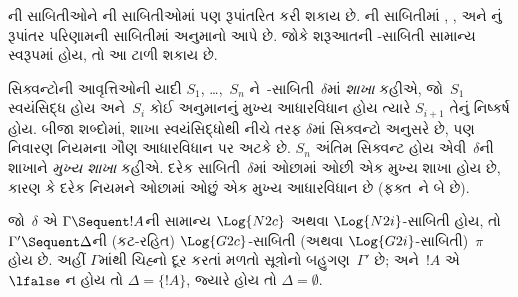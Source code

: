 ની
સાબિતીઓને
ની
સાબિતીઓમાં
પણ રૂપાંતરિત
કરી શકાય છે.
ની
સાબિતીમાં
\Elim{\land},
\Elim{\lif},
\Elim{\lnot} અને
\Elim{\lforall}નું
રૂપાંતર પરિણામની
સાબિતીમાં
\Cut{} અનુમાનો
આપે છે.
જોકે શરૂઆતની
-સાબિતી
સામાન્ય સ્વરૂપમાં
હોય, તો આ
ટાળી શકાય છે.

સિક્વન્ટોની
આવૃત્તિઓની
યાદી
$S_1$, \dots,~$S_n$
ને~-સાબિતી~$\delta$માં
\emph{શાખા} કહીએ,
જો~$S_1$
સ્વયંસિદ્ધ હોય
અને~$S_i$
કોઈ અનુમાનનું
મુખ્ય આધારવિધાન
હોય ત્યારે
$S_{i+1}$
તેનું નિષ્કર્ષ
હોય. બીજા
શબ્દોમાં, શાખા
સ્વયંસિદ્ધોથી
નીચે તરફ
$\delta$માં
સિક્વન્ટો અનુસરે
છે, પણ
નિવારણ
નિયમના ગૌણ
આધારવિધાન પર
અટકે છે.
$S_n$ અંતિમ
સિક્વન્ટ હોય
એવી~$\delta$ની
શાખાને
\emph{મુખ્ય શાખા}
કહીએ. દરેક
સાબિતી~$\delta$માં
ઓછામાં ઓછી
એક મુખ્ય શાખા
હોય છે, કારણ
કે દરેક નિયમને
ઓછામાં ઓછું
એક મુખ્ય
આધારવિધાન છે
(ફક્ત~\Intro{\land}ને
બે છે).


\begin{prop}
જો~$\delta$ એ
$\Gamma \Sequent !A$ની
સામાન્ય
$\Log{N2c}$ અથવા
$\Log{N2i}$-સાબિતી
હોય, તો
$\Gamma' \Sequent \Delta$ની
(કટ-રહિત)
$\Log{G2c}$-સાબિતી
(અથવા
$\Log{G2i}$-સાબિતી)~$\pi$
હોય છે. અહીં
$\Gamma$માંથી
ચિહ્નો દૂર કરતાં
મળતો સૂત્રોનો
બહુગણ~$\Gamma'$
છે; અને~$!A$
એ~$\lfalse$
ન હોય તો
$\Delta = \{!A\}$,
જ્યારે હોય તો
$\Delta = \emptyset$.
\end{prop}

